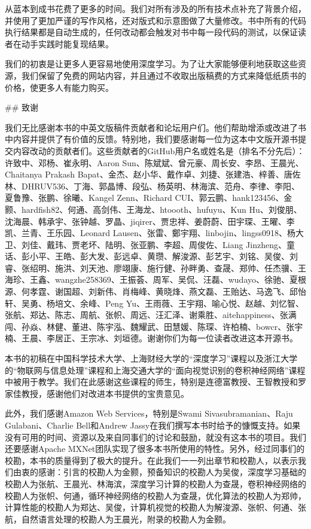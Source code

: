 从蓝本到成书花费了更多的时间。我们对所有涉及的所有技术点补充了背景介绍，并使用了更加严谨的写作风格，还对版式和示意图做了大量修改。书中所有的代码执行结果都是自动生成的，任何改动都会触发对书中每一段代码的测试，以保证读者在动手实践时能复现结果。

我们的初衷是让更多人更容易地使用深度学习。为了让大家能够便利地获取这些资源，我们保留了免费的网站内容，并且通过不收取出版稿费的方式来降低纸质书的价格，使更多人有能力购买。

## 致谢

我们无比感谢本书的中英文版稿件贡献者和论坛用户们。他们帮助增添或改进了书中内容并提供了有价值的反馈。特别地，我们要感谢每一位为这本中文版开源书提交内容改动的贡献者们。这些贡献者的GitHub用户名或姓名是（排名不分先后）：许致中、邓杨、崔永明、Aaron Sun、陈斌斌、曾元豪、周长安、李昂、王晨光、Chaitanya Prakash Bapat、金杰、赵小华、戴作卓、刘捷、张建浩、梓善、唐佐林、DHRUV536、丁海、郭晶博、段弘、杨英明、林海滨、范舟、李律、李阳、夏鲁豫、张鹏、徐曦、Kangel Zenn、Richard CUI、郭云鹏、hank123456、金颢、hardfish82、何通、高剑伟、王海龙、htoooth、hufuyu、Kun Hu、刘俊朋、沈海晨、韩承宇、张钟越、罗晶、jiqirer、贾忠祥、姜蔚蔚、田宇琛、王曜、李凯、兰青、王乐园、Leonard Lausen、张雷、鄭宇翔、linbojin、lingss0918、杨大卫、刘佳、戴玮、贾老坏、陆明、张亚鹏、李超、周俊佐、Liang Jinzheng、童话、彭小平、王皓、彭大发、彭远卓、黄瓒、解浚源、彭艺宇、刘铭、吴俊、刘睿、张绍明、施洪、刘天池、廖翊康、施行健、孙畔勇、查晟、郑帅、任杰骥、王海珍、王鑫、wangzhe258369、王振荟、周军、吴侃、汪磊、wudayo、徐驰、夏根源、何孝霆、谢国超、刘新伟、肖梅峰、黄晓烽、燕文磊、王贻达、马逸飞、邱怡轩、吴勇、杨培文、余峰、Peng Yu、王雨薇、王宇翔、喻心悦、赵越、刘忆智、张航、郑达、陈志、周航、张帜、周远、汪汇泽、谢乘胜、aitehappiness、张满闯、孙焱、林健、董进、陈宇泓、魏耀武、田慧媛、陈琛、许柏楠、bowcr、张宇楠、王晨、李居正、王宗冰、刘垣德。谢谢你们为每一位读者改进这本开源书。

本书的初稿在中国科学技术大学、上海财经大学的“深度学习”课程以及浙江大学的“物联网与信息处理”课程和上海交通大学的“面向视觉识别的卷积神经网络”课程中被用于教学。我们在此感谢这些课程的师生，特别是连德富教授、王智教授和罗家佳教授，感谢他们对改进本书提供的宝贵意见。

此外，我们感谢Amazon Web Services，特别是Swami Sivasubramanian、Raju Gulabani、Charlie Bell和Andrew Jassy在我们撰写本书时给予的慷慨支持。如果没有可用的时间、资源以及来自同事们的讨论和鼓励，就没有这本书的项目。我们还要感谢Apache MXNet团队实现了很多本书所使用的特性。另外，经过同事们的校勘，本书的质量得到了极大的提升。在此我们一一列出章节和校勘人，以表示我们由衷的感谢：引言的校勘人为金颢，预备知识的校勘人为吴俊，深度学习基础的校勘人为张航、王晨光、林海滨，深度学习计算的校勘人为查晟，卷积神经网络的校勘人为张帜、何通，循环神经网络的校勘人为查晟，优化算法的校勘人为郑帅，计算性能的校勘人为郑达、吴俊，计算机视觉的校勘人为解浚源、张帜、何通、张航，自然语言处理的校勘人为王晨光，附录的校勘人为金颢。

